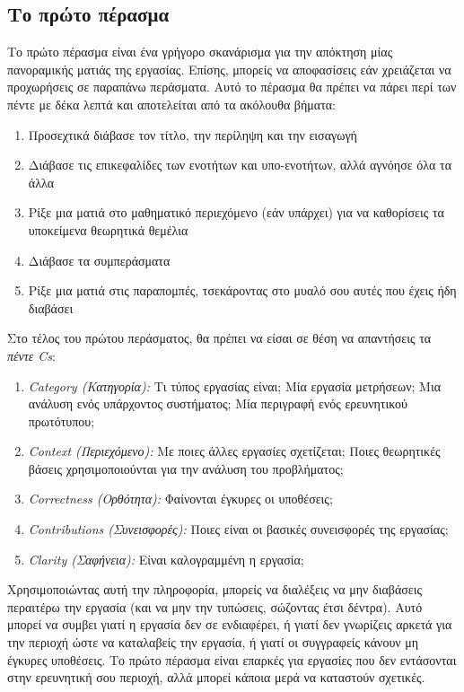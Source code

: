\documentclass{article}
\begin{document}
\subsection{Το πρώτο πέρασμα}
\par
Το πρώτο πέρασμα είναι ένα γρήγορο σκανάρισμα για την απόκτηση μίας πανοραμικής ματιάς της εργασίας. Επίσης, μπορείς να αποφασίσεις εάν χρειάζεται να προχωρήσεις σε παραπάνω περάσματα. Αυτό το πέρασμα θα πρέπει να πάρει περί των πέντε με δέκα λεπτά και αποτελείται από τα ακόλουθα βήματα:
\begin{enumerate}
    \item Προσεχτικά διάβασε τον τίτλο, την περίληψη και την εισαγωγή
    \item Διάβασε τις επικεφαλίδες των ενοτήτων και υπο-ενοτήτων, αλλά αγνόησε όλα τα άλλα
    \item Ρίξε μια ματιά στο μαθηματικό περιεχόμενο (εάν υπάρχει) για να καθορίσεις τα υποκείμενα θεωρητικά θεμέλια
    \item Διάβασε τα συμπεράσματα
    \item Ρίξε μια ματιά στις παραπομπές, τσεκάροντας στο μυαλό σου αυτές που έχεις ήδη διαβάσει
\end{enumerate}
\par
Στο τέλος του πρώτου περάσματος, θα πρέπει να είσαι σε θέση να απαντήσεις τα \textit{πέντε \textlatin{Cs}}:
\begin{enumerate}
    \item \textit{\textlatin{Category} (Κατηγορία):} Τι τύπος εργασίας είναι\textlatin{;} Μία εργασία μετρήσεων\textlatin{;} Μια ανάλυση ενός υπάρχοντος συστήματος\textlatin{;} Μία περιγραφή ενός ερευνητικού πρωτότυπου\textlatin{;}
    \item \textit{\textlatin{Context} (Περιεχόμενο):} Με ποιες άλλες εργασίες σχετίζεται\textlatin{;} Ποιες θεωρητικές βάσεις χρησιμοποιούνται για την ανάλυση του προβλήματος\textlatin{;}
    \item \textit{\textlatin{Correctness} (Ορθότητα):} Φαίνονται έγκυρες οι υποθέσεις\textlatin{;}
    \item \textit{\textlatin{Contributions} (Συνεισφορές):} Ποιες είναι οι βασικές συνεισφορές της εργασίας\textlatin{;}
    \item \textit{\textlatin{Clarity} (Σαφήνεια):} Είναι καλογραμμένη η εργασία\textlatin{;}
\end{enumerate}
\par
Χρησιμοποιώντας αυτή την πληροφορία, μπορείς να διαλέξεις να μην διαβάσεις περαιτέρω την εργασία (και να μην την τυπώσεις, σώζοντας έτσι δέντρα). Αυτό μπορεί να συμβει γιατί η εργασία δεν σε ενδιαφέρει, ή γιατί δεν γνωρίζεις αρκετά για την περιοχή ώστε να καταλαβείς την εργασία, ή γιατί οι συγγραφείς κάνουν μη έγκυρες υποθέσεις. Το πρώτο πέρασμα είναι επαρκές για εργασίες που δεν εντάσονται στην ερευνητική σου περιοχή, αλλά μπορεί κάποια μερά να καταστούν σχετικές.
\end{document}
